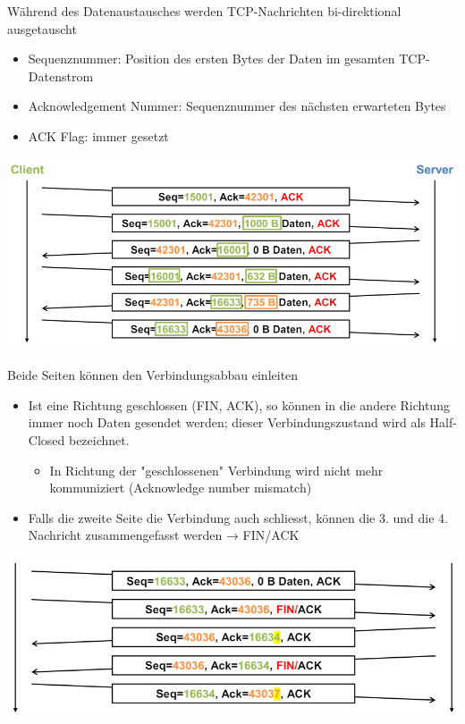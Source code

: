 \begin{example}
    Während des Datenaustausches werden TCP-Nachrichten bi-direktional ausgetauscht
    \begin{itemize}
        \item Sequenznummer: Position des ersten Bytes der Daten im gesamten TCP-Datenstrom
        \item Acknowledgement Nummer: Sequenznummer des nächsten erwarteten Bytes
        \item ACK Flag: immer gesetzt
    \end{itemize}
        \includegraphics[width=0.75\linewidth]{images/tcp_datenaustausch_ex.png}
\end{example}

\begin{example}
    Beide Seiten können den Verbindungsabbau einleiten
    \begin{itemize}
        \item Ist eine Richtung geschlossen (FIN, ACK), so können in die andere Richtung immer noch Daten gesendet werden; dieser Verbindungszustand wird als Half-Closed bezeichnet.
        \begin{itemize}
            \item In Richtung der "geschlossenen" Verbindung wird nicht mehr kommuniziert (Acknowledge number mismatch)
        \end{itemize}
        \item Falls die zweite Seite die Verbindung auch schliesst, können die 3. und die 4. Nachricht zusammengefasst werden → FIN/ACK
    \end{itemize}
        \includegraphics[width=0.75\linewidth]{images/tcp_verbindungsabbau_ex.png}
\end{example}

